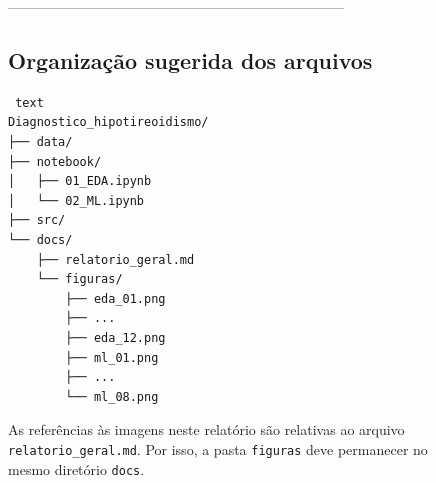\documentclass{article}
\begin{document}
------------------------------------------------------------------------ \\

\subsection{Organização sugerida dos arquivos}


\begin{lstlisting}
 text
Diagnostico_hipotireoidismo/
├── data/
├── notebook/
│   ├── 01_EDA.ipynb
│   └── 02_ML.ipynb
├── src/
└── docs/
    ├── relatorio_geral.md
    └── figuras/
        ├── eda_01.png
        ├── ...
        ├── eda_12.png
        ├── ml_01.png
        ├── ...
        └── ml_08.png

\end{lstlisting}


As referências às imagens neste relatório são relativas ao arquivo \\
\texttt{relatorio\_geral.md}. Por isso, a pasta \texttt{figuras} deve permanecer no \\
mesmo diretório \texttt{docs}. \\
\end{document}
